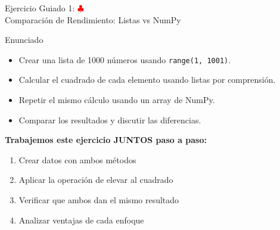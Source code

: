 \documentclass[10pt]{beamer}
\begin{document}
\begin{frame}{Ejercicio Guiado 1: \hfill \textcolor{red}{$\clubsuit$} \\ Comparación de Rendimiento: Listas vs NumPy}
  \begin{block}{Enunciado}
    \begin{itemize}
      \item Crear una lista de 1000 números usando \texttt{range(1, 1001)}.
      \item Calcular el cuadrado de cada elemento usando listas por comprensión.
      \item Repetir el mismo cálculo usando un array de NumPy.
      \item Comparar los resultados y discutir las diferencias.
    \end{itemize}
  \end{block}
  
  \textbf{Trabajemos este ejercicio JUNTOS paso a paso:}
  \begin{enumerate}
    \item Crear datos con ambos métodos
    \item Aplicar la operación de elevar al cuadrado
    \item Verificar que ambos dan el mismo resultado
    \item Analizar ventajas de cada enfoque
  \end{enumerate}
\end{frame}
\end{document}

